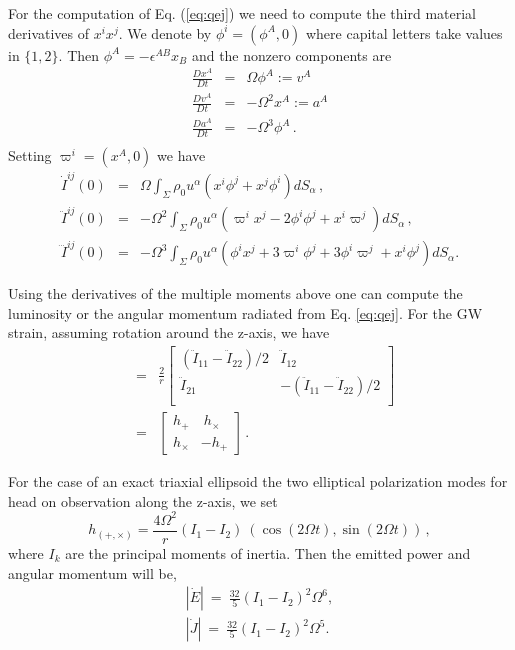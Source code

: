 \documentclass[twocolumn,superscriptaddress,showpacs,prd,aps,amsmath,amssymb,nofootinbib]{revtex4-1}
\newcommand{\GA}{\alpha}
\newcommand{\GE}{\epsilon}
\newcommand{\GR}{\rho}
\newcommand{\GP}{\phi}
\newcommand{\be}{\begin{equation}}
\newcommand{\ee}{\end{equation}}
\begin{document}
For the computation of Eq. (\ref{eq:qej}) we need to compute the third material derivatives of $x^i x^j$.
We denote by $\GP^i=(\GP^A,0)$ where capital letters take values in $\{1,2\}$. Then $\GP^A=-\GE^{AB}x_B$
and the nonzero components are
\begin{eqnarray*}
\frac{Dx^A}{Dt} & = & \Omega \GP^A := v^A   \\
\frac{Dv^A}{Dt} & = & -\Omega^2 x^A := a^A  \\
\frac{Da^A}{Dt} & = & -\Omega^3 \GP^A   \, .    \\
\end{eqnarray*}
Setting $\varpi^i=(x^A,0)$ we have
\begin{eqnarray*}
\dot{I}^{ij}(0)   & = & \Omega\int_{\Sigma} \GR_0 u^\GA (x^i \GP^j+ x^j \GP^i) dS_\GA \,, \\
\ddot{I}^{ij}(0)  & = & -\Omega^2\int_{\Sigma} \GR_0 u^\GA (\varpi^i x^j - 2\GP^i \GP^j + x^i \varpi^j) dS_\GA \,,  \\
\dddot{I}^{ij}(0) & = & -\Omega^3\int_{\Sigma} \GR_0 u^\GA (\GP^i x^j+ 3\varpi^i \GP^j + 3\GP^i \varpi^j + x^i \GP^j) dS_\GA . 
\end{eqnarray*}

Using the derivatives of the multiple moments above one can compute the luminosity
or the angular momentum radiated from Eq. \ref{eq:qej}. For
the GW strain, assuming rotation around the z-axis, we have
\begin{eqnarray*}
[h_{AB}] & = & \frac{2}{r}
\begin{bmatrix}
(\ddot{I}_{11} -\ddot{I}_{22})/2 &  \ddot{I}_{12}                     \\
\ddot{I}_{21}                    & -(\ddot{I}_{11} -\ddot{I}_{22})/2  \\
\end{bmatrix}   \\
         & = & 
\begin{bmatrix}
h_{+}      & \ h_{\times}  \\
h_{\times} & -h_{+}
\end{bmatrix}      \, .
\end{eqnarray*}

For the case of an exact triaxial ellipsoid
the two elliptical polarization modes for head on observation along the z-axis, we set
\be
h_{(+,\times)}=\frac{4\Omega^2}{r}(I_1-I_2)\ (\cos(2\Omega t), \sin(2\Omega t)) \, ,
\label{eq:h0}
\ee
where $I_k$ are the principal moments of inertia.
Then the emitted power and angular momentum will be,
\begin{eqnarray}
|\dot{E}| \ =\ \frac{32}{5} (I_1-I_2)^2  \Omega^6 , \\
|\dot{J}| \ =\ \frac{32}{5} (I_1-I_2)^2  \Omega^5 .
\label{eq:lum}
\end{eqnarray}
\end{document}
